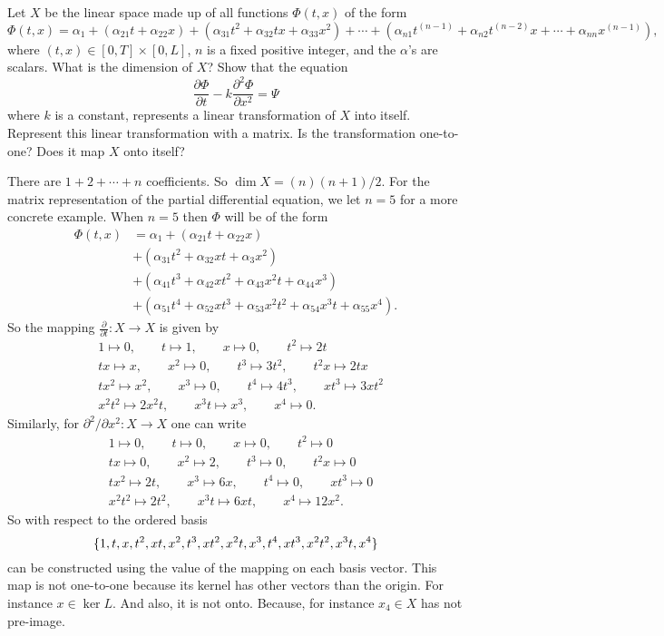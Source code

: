 \begin{problem}
	Let $ X $ be the linear space made up of all functions $ \Phi(t,x) $ of the form
	\[ \Phi(t,x) = \alpha_1 + (\alpha_{21}t+\alpha_{22}x)  + (\alpha_{31}t^2 + \alpha_{32}tx + \alpha_{33}x^2) + \cdots + (\alpha_{n1}t^{(n-1)}+\alpha_{n2}t^{(n-2)}x + \cdots + \alpha_{nn}x^{(n-1)}), \]
	where $ (t,x)\in [0,T]\times [0,L] $, $ n $ is a fixed positive integer, and the $ \alpha $'s are scalars. What is the dimension of $ X $? Show that the equation
	\[ \frac{\partial \Phi}{\partial t} - k \frac{\partial^2 \Phi}{\partial x^2} = \Psi \]
	where $ k $ is a constant, represents a linear transformation of $ X $ into itself. Represent this linear transformation with a matrix. Is the transformation one-to-one? Does it map $ X $ onto itself?
\end{problem}
\begin{solution}
	There are $ 1+2+\cdots+n $ coefficients. So $ \dim X = (n)(n+1)/2 $. For the matrix representation of the partial differential equation, we let $ n=5 $ for a more concrete example. When $ n=5 $ then $ \Phi $ will be of the form
	\begin{align*}
		\Phi(t,x) &= \alpha_1 + (\alpha_{21}t + \alpha_{22}x) \\
		& + (\alpha_{31}t^2 + \alpha_{32}xt + \alpha_{3}x^2) \\
		& + (\alpha_{41}t^3 + \alpha_{42}xt^2 + \alpha_{43}x^2t + \alpha_{44}x^3) \\
		& + (\alpha_{51}t^4 + \alpha_{52}xt^3 + \alpha_{53}x^2t^2 + \alpha_{54}x^3t + \alpha_{55}x^4).
	\end{align*} 
	So the mapping $ \frac{\partial}{\partial t}: X\to X $ is given by
	\begin{align*}
		&1\mapsto 0,\qquad t\mapsto 1,\qquad x\mapsto 0,\qquad t^2 \mapsto 2t \\
		&tx\mapsto x,\qquad x^2\mapsto 0,\qquad t^3 \mapsto 3t^2,\qquad t^2x \mapsto 2tx \\
		&tx^2 \mapsto x^2,\qquad x^3\mapsto 0, \qquad t^4\mapsto 4t^3, \qquad xt^3\mapsto 3xt^2 \\
		&x^2t^2\mapsto 2x^2t,\qquad x^3t\mapsto x^3,\qquad x^4\mapsto 0.
	\end{align*}
	Similarly, for $ \partial^2/\partial x^2 : X\to X $ one can write
	\begin{align*}
		&1\mapsto 0,\qquad t\mapsto 0,\qquad x\mapsto 0,\qquad t^2 \mapsto 0 \\
		&tx\mapsto 0,\qquad x^2\mapsto 2,\qquad t^3 \mapsto 0,\qquad t^2x \mapsto 0 \\
		&tx^2 \mapsto 2t,\qquad x^3\mapsto 6x,\qquad t^4\mapsto 0, \qquad xt^3\mapsto 0 \\
		&x^2t^2\mapsto 2t^2,\qquad x^3t\mapsto 6xt,\qquad x^4\mapsto 12x^2.
	\end{align*}
	So with respect to the ordered basis
	\[ \{1,t,x,t^2,xt,x^2,t^3,xt^2,x^2t,x^3,t^4,xt^3,x^2t^2,x^3t,x^4\} \]
	can be constructed using the value of the mapping on each basis vector.
	This map is not one-to-one because its kernel has other vectors than the origin. For instance $ x\in \ker L $. And also, it is not onto. Because, for instance $ x_4 \in X$ has not pre-image. 
\end{solution}


